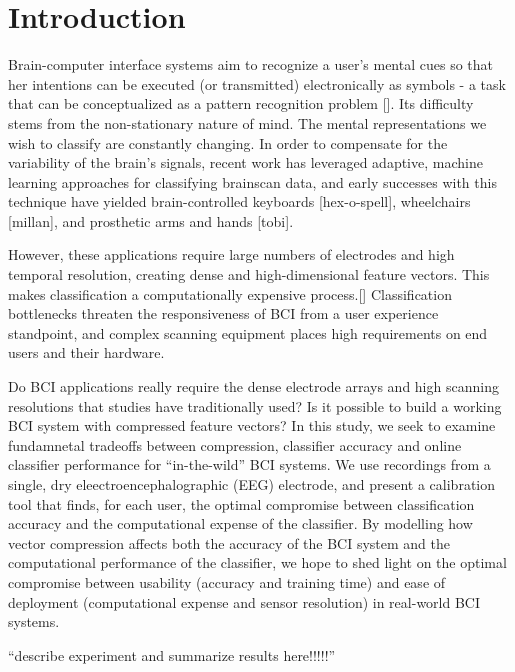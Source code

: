 \section{Introduction}

Brain-computer interface systems aim to recognize a user's mental cues so that her intentions can be executed (or transmitted) electronically as symbols - a task that can be conceptualized as a pattern recognition problem []. Its difficulty stems from the non-stationary nature of mind. The mental representations we wish to classify are constantly changing. In order to compensate for the variability of the brain's signals, recent work has leveraged adaptive, machine learning approaches for classifying brainscan data, and early successes with this technique have yielded brain-controlled keyboards [hex-o-spell], wheelchairs [millan], and prosthetic arms and hands [tobi].

However, these applications require large numbers of electrodes and high temporal resolution, creating dense and high-dimensional feature vectors. This makes classification a computationally expensive process.[] Classification bottlenecks threaten the responsiveness of BCI from a user experience standpoint, and complex scanning equipment places high requirements on end users and their hardware. 

Do BCI applications really require the dense electrode arrays and high scanning resolutions that studies have traditionally used? Is it possible to build a working BCI system with compressed feature vectors? In this study, we seek to examine fundamnetal tradeoffs between compression, classifier accuracy and online classifier performance for ``in-the-wild'' BCI systems. We use recordings from a single, dry eleectroencephalographic (EEG) electrode, and present a calibration tool that finds, for each user, the optimal compromise between classification accuracy and the computational expense of the classifier. By modelling how vector compression affects both the accuracy of the BCI system and the computational performance of the classifier, we hope to shed light on the optimal compromise between usability (accuracy and training time) and ease of deployment (computational expense and sensor resolution) in real-world BCI systems.

``describe experiment and summarize results here!!!!!''



